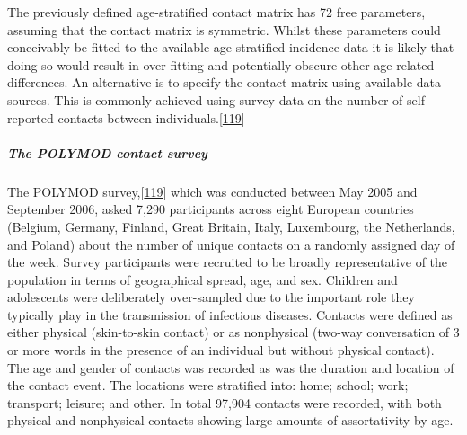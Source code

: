 \documentclass[11pt,twoside]{bristolthesis}
\begin{document}
  The previously defined age-stratified contact matrix has 72 free parameters, assuming that the contact matrix is symmetric. Whilst these parameters could conceivably be fitted to the available age-stratified incidence data it is likely that doing so would result in over-fitting and potentially obscure other age related differences. An alternative is to specify the contact matrix using available data sources. This is commonly achieved using survey data on the number of self reported contacts between individuals.{[}\protect\hyperlink{ref-Mossong2008}{119}{]}
  
  \hypertarget{the-polymod-contact-survey}{%
  \subparagraph{The POLYMOD contact survey}\label{the-polymod-contact-survey}}
  
  The POLYMOD survey,{[}\protect\hyperlink{ref-Mossong2008}{119}{]} which was conducted between May 2005 and September 2006, asked 7,290 participants across eight European countries (Belgium, Germany, Finland, Great Britain, Italy, Luxembourg, the Netherlands, and Poland) about the number of unique contacts on a randomly assigned day of the week. Survey participants were recruited to be broadly representative of the population in terms of geographical spread, age, and sex. Children and adolescents were deliberately over-sampled due to the important role they typically play in the transmission of infectious diseases. Contacts were defined as either physical (skin-to-skin contact) or as nonphysical (two-way conversation of 3 or more words in the presence of an individual but without physical contact). The age and gender of contacts was recorded as was the duration and location of the contact event. The locations were stratified into: home; school; work; transport; leisure; and other. In total 97,904 contacts were recorded, with both physical and nonphysical contacts showing large amounts of assortativity by age.
  
\end{document}
